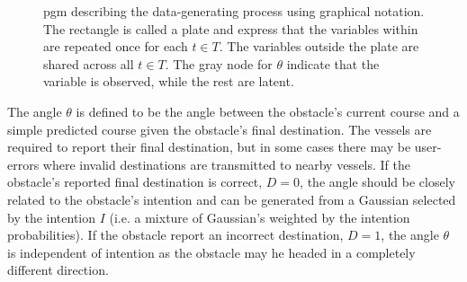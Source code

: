 \begin{figure}[h]
    \centering
    \caption{\acrshort{pgm} describing the data-generating process using graphical notation. The rectangle is called a plate and express that the variables within are repeated once for each $t \in T$. The variables outside the plate are shared across all $t \in T$. The gray node for $\theta$ indicate that the variable is observed, while the rest are latent.}
    \label{fig:example_pgm}
\end{figure}

The angle $\theta$ is defined to be the angle between the obstacle's current course and a simple predicted course given the obstacle's final destination. The vessels are required to report their final destination, but in some cases there may be user-errors where invalid destinations are transmitted to nearby vessels. If the obstacle's reported final destination is correct, $D=0$, the angle should be closely related to the obstacle's intention and can be generated from a Gaussian selected by the intention $I$ (i.e. a mixture of Gaussian's weighted by the intention probabilities). If the obstacle report an incorrect destination, $D=1$, the angle $\theta$ is independent of intention as the obstacle may he headed in a completely different direction.

